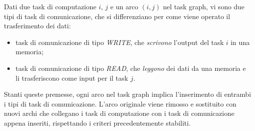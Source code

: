 Dati due task di computazione $i$, $j$ e un 
arco $(i,j)$ nel task graph, vi sono due tipi di task di comunicazione, che si 
differenziano per come viene operato il trasferimento dei dati:
\begin{itemize}
 \item task di comunicazione di tipo \emph{WRITE}, che \emph{scrivono} 
l'output del task $i$ in una memoria;
 \item task di comunicazione di tipo \emph{READ}, che \emph{leggono} dei dati 
da una memoria e li trasferiscono come input per il task $j$. 
\end{itemize}
Stanti queste premesse, ogni arco nel task graph implica l'inserimento di 
entrambi i tipi di task di comunicazione. L'arco originale viene rimosso e 
sostituito con nuovi archi che collegano i task di computazione con i task di 
comunicazione appena inseriti, rispettando i criteri precedentemente stabiliti.


